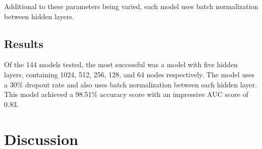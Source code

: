 \documentclass[12pt]{article}  %
\theoremstyle{definition}
\theoremstyle{remark}
\begin{document}
Additional to these parameters being varied, each model uses batch normalization between hidden layers.

\subsection{Results}
\par Of the 144 models tested, the most successful was a model with five hidden layers, containing 1024, 512, 256, 128, and 64 nodes respectively. The model uses a 30\% dropout rate and also uses batch normalization between each hidden layer. This model achieved a 98.51\% accuracy score with an impressive AUC score of 0.83. 

\section{Discussion}



\end{document}
